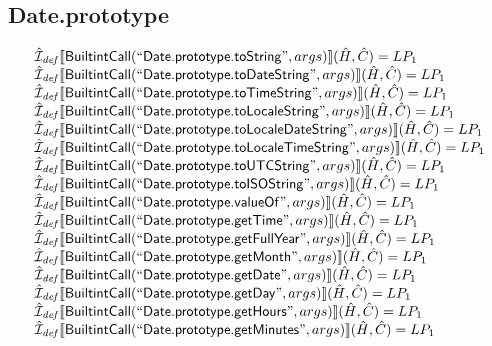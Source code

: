 \subsection{Date.prototype}
\[
\begin{array}{l}

\hat{\mathcal{I}}_{\it def}\llbracket \mbox{\textsf{BuiltintCall}}(``\mbox{\textsf{Date.prototype.toString}}",args)\rrbracket(\hat{H},\hat{C}) = LP_1\\
\hat{\mathcal{I}}_{\it def}\llbracket \mbox{\textsf{BuiltintCall}}(``\mbox{\textsf{Date.prototype.toDateString}}",args)\rrbracket(\hat{H},\hat{C}) = LP_1\\
\hat{\mathcal{I}}_{\it def}\llbracket \mbox{\textsf{BuiltintCall}}(``\mbox{\textsf{Date.prototype.toTimeString}}",args)\rrbracket(\hat{H},\hat{C}) = LP_1\\
\hat{\mathcal{I}}_{\it def}\llbracket \mbox{\textsf{BuiltintCall}}(``\mbox{\textsf{Date.prototype.toLocaleString}}",args)\rrbracket(\hat{H},\hat{C}) = LP_1\\
\hat{\mathcal{I}}_{\it def}\llbracket \mbox{\textsf{BuiltintCall}}(``\mbox{\textsf{Date.prototype.toLocaleDateString}}",args)\rrbracket(\hat{H},\hat{C}) = LP_1\\
\hat{\mathcal{I}}_{\it def}\llbracket \mbox{\textsf{BuiltintCall}}(``\mbox{\textsf{Date.prototype.toLocaleTimeString}}",args)\rrbracket(\hat{H},\hat{C}) = LP_1\\
\hat{\mathcal{I}}_{\it def}\llbracket \mbox{\textsf{BuiltintCall}}(``\mbox{\textsf{Date.prototype.toUTCString}}",args)\rrbracket(\hat{H},\hat{C}) = LP_1\\
\hat{\mathcal{I}}_{\it def}\llbracket \mbox{\textsf{BuiltintCall}}(``\mbox{\textsf{Date.prototype.toISOString}}",args)\rrbracket(\hat{H},\hat{C}) = LP_1\\
\hat{\mathcal{I}}_{\it def}\llbracket \mbox{\textsf{BuiltintCall}}(``\mbox{\textsf{Date.prototype.valueOf}}",args)\rrbracket(\hat{H},\hat{C}) = LP_1\\
\hat{\mathcal{I}}_{\it def}\llbracket \mbox{\textsf{BuiltintCall}}(``\mbox{\textsf{Date.prototype.getTime}}",args)\rrbracket(\hat{H},\hat{C}) = LP_1\\
\hat{\mathcal{I}}_{\it def}\llbracket \mbox{\textsf{BuiltintCall}}(``\mbox{\textsf{Date.prototype.getFullYear}}",args)\rrbracket(\hat{H},\hat{C}) = LP_1\\
\hat{\mathcal{I}}_{\it def}\llbracket \mbox{\textsf{BuiltintCall}}(``\mbox{\textsf{Date.prototype.getMonth}}",args)\rrbracket(\hat{H},\hat{C}) = LP_1\\
\hat{\mathcal{I}}_{\it def}\llbracket \mbox{\textsf{BuiltintCall}}(``\mbox{\textsf{Date.prototype.getDate}}",args)\rrbracket(\hat{H},\hat{C}) = LP_1\\
\hat{\mathcal{I}}_{\it def}\llbracket \mbox{\textsf{BuiltintCall}}(``\mbox{\textsf{Date.prototype.getDay}}",args)\rrbracket(\hat{H},\hat{C}) = LP_1\\
\hat{\mathcal{I}}_{\it def}\llbracket \mbox{\textsf{BuiltintCall}}(``\mbox{\textsf{Date.prototype.getHours}}",args)\rrbracket(\hat{H},\hat{C}) = LP_1\\
\hat{\mathcal{I}}_{\it def}\llbracket \mbox{\textsf{BuiltintCall}}(``\mbox{\textsf{Date.prototype.getMinutes}}",args)\rrbracket(\hat{H},\hat{C}) = LP_1\\

\end{array}\]
